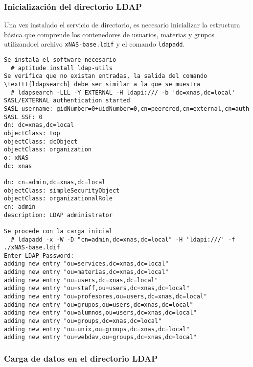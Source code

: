           \subsubsection {Inicializaci\'{o}n del directorio \textsc{LDAP}}

Una vez instalado el servicio de directorio, es necesario inicializar la estructura b\'{a}sica que comprende los contenedores de usuarios, materias y grupos utilizandoel archivo \texttt{xNAS-base.ldif} y el comando \texttt{ldapadd}.


{
\scriptsize
\linespread{1}
\begin{verbatim}
Se instala el software necesario
  # aptitude install ldap-utils
Se verifica que no existan entradas, la salida del comando \texttt{ldapsearch} debe ser similar a la que se muestra
  # ldapsearch -LLL -Y EXTERNAL -H ldapi:/// -b 'dc=xnas,dc=local'
SASL/EXTERNAL authentication started
SASL username: gidNumber=0+uidNumber=0,cn=peercred,cn=external,cn=auth
SASL SSF: 0
dn: dc=xnas,dc=local
objectClass: top
objectClass: dcObject
objectClass: organization
o: xNAS
dc: xnas

dn: cn=admin,dc=xnas,dc=local
objectClass: simpleSecurityObject
objectClass: organizationalRole
cn: admin
description: LDAP administrator

Se procede con la carga inicial
  # ldapadd -x -W -D "cn=admin,dc=xnas,dc=local" -H 'ldapi:///' -f ./xNAS-base.ldif
Enter LDAP Password: 
adding new entry "ou=services,dc=xnas,dc=local"
adding new entry "ou=materias,dc=xnas,dc=local"
adding new entry "ou=users,dc=xnas,dc=local"
adding new entry "ou=staff,ou=users,dc=xnas,dc=local"
adding new entry "ou=profesores,ou=users,dc=xnas,dc=local"
adding new entry "ou=grupos,ou=users,dc=xnas,dc=local"
adding new entry "ou=alumnos,ou=users,dc=xnas,dc=local"
adding new entry "ou=groups,dc=xnas,dc=local"
adding new entry "ou=unix,ou=groups,dc=xnas,dc=local"
adding new entry "ou=webdav,ou=groups,dc=xnas,dc=local"

\end{verbatim}
}

          \subsubsection {Carga de datos en el directorio \textsc{LDAP}}

